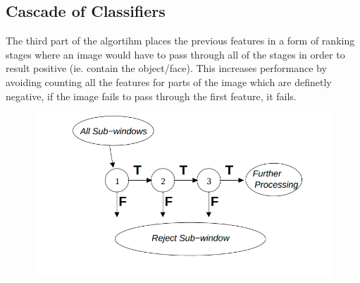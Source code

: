 \documentclass[12pt, letterpaper]{article}
\begin{document}
        \subsection{Cascade of Classifiers}
            The third part of the algortihm places the previous features
            in a form of ranking stages where an image would have to
            pass through all of the stages in order to result positive
            (ie. contain the object/face).
            This increases performance by avoiding counting all the features
            for parts of the image which are definetly negative, if the
            image fails to pass through the first feature, it fails.
                

            \begin{figure}[h]
            \includegraphics[scale=0.3]{cascade.png}
            \centering
            \end{figure}
                
\end{document}
